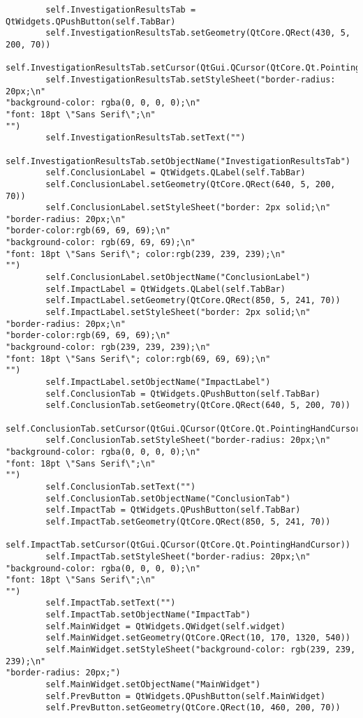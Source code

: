 \documentclass{article}
\begin{document}
\begin{lstlisting}
        self.InvestigationResultsTab = QtWidgets.QPushButton(self.TabBar)
        self.InvestigationResultsTab.setGeometry(QtCore.QRect(430, 5, 200, 70))
        self.InvestigationResultsTab.setCursor(QtGui.QCursor(QtCore.Qt.PointingHandCursor))
        self.InvestigationResultsTab.setStyleSheet("border-radius: 20px;\n"
"background-color: rgba(0, 0, 0, 0);\n"
"font: 18pt \"Sans Serif\";\n"
"")
        self.InvestigationResultsTab.setText("")
        self.InvestigationResultsTab.setObjectName("InvestigationResultsTab")
        self.ConclusionLabel = QtWidgets.QLabel(self.TabBar)
        self.ConclusionLabel.setGeometry(QtCore.QRect(640, 5, 200, 70))
        self.ConclusionLabel.setStyleSheet("border: 2px solid;\n"
"border-radius: 20px;\n"
"border-color:rgb(69, 69, 69);\n"
"background-color: rgb(69, 69, 69);\n"
"font: 18pt \"Sans Serif\"; color:rgb(239, 239, 239);\n"
"")
        self.ConclusionLabel.setObjectName("ConclusionLabel")
        self.ImpactLabel = QtWidgets.QLabel(self.TabBar)
        self.ImpactLabel.setGeometry(QtCore.QRect(850, 5, 241, 70))
        self.ImpactLabel.setStyleSheet("border: 2px solid;\n"
"border-radius: 20px;\n"
"border-color:rgb(69, 69, 69);\n"
"background-color: rgb(239, 239, 239);\n"
"font: 18pt \"Sans Serif\"; color:rgb(69, 69, 69);\n"
"")
        self.ImpactLabel.setObjectName("ImpactLabel")
        self.ConclusionTab = QtWidgets.QPushButton(self.TabBar)
        self.ConclusionTab.setGeometry(QtCore.QRect(640, 5, 200, 70))
        self.ConclusionTab.setCursor(QtGui.QCursor(QtCore.Qt.PointingHandCursor))
        self.ConclusionTab.setStyleSheet("border-radius: 20px;\n"
"background-color: rgba(0, 0, 0, 0);\n"
"font: 18pt \"Sans Serif\";\n"
"")
        self.ConclusionTab.setText("")
        self.ConclusionTab.setObjectName("ConclusionTab")
        self.ImpactTab = QtWidgets.QPushButton(self.TabBar)
        self.ImpactTab.setGeometry(QtCore.QRect(850, 5, 241, 70))
        self.ImpactTab.setCursor(QtGui.QCursor(QtCore.Qt.PointingHandCursor))
        self.ImpactTab.setStyleSheet("border-radius: 20px;\n"
"background-color: rgba(0, 0, 0, 0);\n"
"font: 18pt \"Sans Serif\";\n"
"")
        self.ImpactTab.setText("")
        self.ImpactTab.setObjectName("ImpactTab")
        self.MainWidget = QtWidgets.QWidget(self.widget)
        self.MainWidget.setGeometry(QtCore.QRect(10, 170, 1320, 540))
        self.MainWidget.setStyleSheet("background-color: rgb(239, 239, 239);\n"
"border-radius: 20px;")
        self.MainWidget.setObjectName("MainWidget")
        self.PrevButton = QtWidgets.QPushButton(self.MainWidget)
        self.PrevButton.setGeometry(QtCore.QRect(10, 460, 200, 70))

\end{lstlisting}
\end{document}

